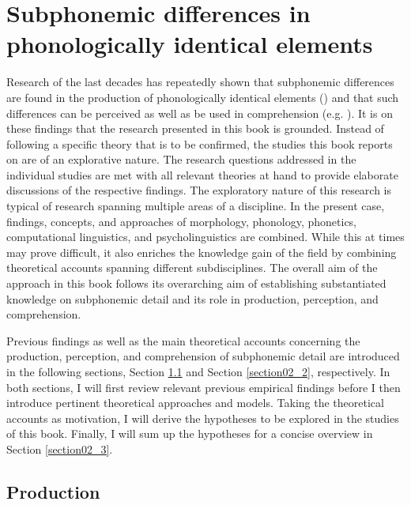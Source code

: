 \chapter{Subphonemic differences in phonologically identical elements}\label{chapter02}

Research of the last decades has repeatedly shown that subphonemic differences are found in the production of phonologically identical elements (\cite{Walsh1983, Hsieh1999, Cho2001, Jurafsky2002, Lavoie2002, Sugahara2004, Sugahara2009, Kemps2005a, Kemps2005b, Gahl2008, Drager2011, Smith2012, Zimmermann2016, BenHedia2017, Plag2017, Seyfarth2017, Lohmann2018, BenHedia2019, Tomaschek2019, Plag2020}) and that such differences can be perceived as well as be used in comprehension (e.g. \cite{Klatt1975, Warner2004, Kemps2005a, Kemps2005b, Shatzman2006}). It is on these findings that the research presented in this book is grounded. Instead of following a specific theory that is to be confirmed, the studies this book reports on are of an explorative nature. The research questions addressed in the individual studies are met with all relevant theories at hand to provide elaborate discussions of the respective findings. The exploratory nature of this research is typical of research spanning multiple areas of a discipline. In the present case, findings, concepts, and approaches of morphology, phonology, phonetics, computational linguistics, and psycholinguistics are combined. While this at times may prove difficult, it also enriches the knowledge gain of the field by combining theoretical accounts spanning different subdisciplines. The overall aim of the approach in this book follows its overarching aim of establishing substantiated knowledge on subphonemic detail and its role in production, perception, and comprehension. 

Previous findings as well as the main theoretical accounts concerning the production, perception, and comprehension of subphonemic detail are introduced in the following sections, Section \ref{section02_1} and Section \ref{section02_2}, respectively. In both sections, I will first review relevant previous empirical findings before I then introduce pertinent theoretical approaches and models. Taking the theoretical accounts as motivation, I will derive the hypotheses to be explored in the studies of this book. Finally, I will sum up the hypotheses for a concise overview in Section \ref{section02_3}.

\section{Production}\label{section02_1}

